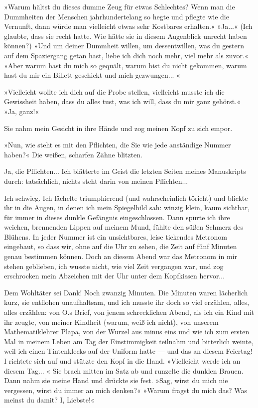 »Warum hältst du dieses dumme Zeug für etwas Schlechtes? Wenn man
die Dummheiten der Menschen jahrhundertelang so hegte und pflegte
wie die Vernunft, dann würde man vielleicht etwas sehr Kostbares
erhalten.« »Ja...« (Ich glaubte, dass sie recht hatte. Wie hätte
sie in diesem Augenblick unrecht haben können?) »Und um deiner
Dummheit willen, um dessentwillen, was du gestern auf dem
Spaziergang getan hast, liebe ich dich noch mehr, viel mehr als
zuvor.« »Aber warum hast du mich so gequält, warum bist du nicht
gekommen, warum hast du mir ein Billett geschickt und mich
gezwungen... «

»Vielleicht wollte ich dich auf die Probe stellen, vielleicht
musste ich die Gewissheit haben, dass du alles tust, was ich will,
dass du mir ganz gehörst.« »Ja, ganz!«

Sie nahm mein Gesicht in ihre Hände und zog meinen Kopf zu sich
empor.

»Nun, wie steht es mit den Pflichten, die Sie wie jede anständige
Nummer haben?« Die weißen, scharfen Zähne blitzten.

Ja, die Pflichten... Ich blätterte im Geist die letzten Seiten
meines Manuskripts durch: tatsächlich, nichts steht darin von
meinen Pflichten...

Ich schwieg. Ich lächelte triumphierend (und wahrscheinlich
töricht) und blickte ihr in die Augen, in denen ich mein
Spiegelbild sah: winzig klein, kaum sichtbar, für immer in dieses
dunkle Gefängnis eingeschlossen. Dann spürte ich ihre weichen,
brennenden Lippen auf meinem Mund, fühlte den süßen Schmerz des
Blühens. In jeder Nummer ist ein unsichtbares, leise tickendes
Metronom eingebaut, so dass wir, ohne auf die Uhr zu sehen, die
Zeit auf fünf Minuten genau bestimmen können. Doch an diesem Abend
war das Metronom in mir stehen geblieben, ich wusste nicht, wie
viel Zeit vergangen war, und zog erschrocken mein Abzeichen mit der
Uhr unter dem Kopfkissen hervor...

Dem Wohltäter sei Dank! Noch zwanzig Minuten. Die Minuten waren
lächerlich kurz, sie entflohen unaufhaltsam, und ich musste ihr
doch so viel erzählen, alles, alles erzählen: von O.s Brief, von
jenem schrecklichen Abend, als ich ein Kind mit ihr zeugte, von
meiner Kindheit (warum, weiß ich nicht), von unserem
Mathematiklehrer Plapa, von der Wurzel aus minus eins und wie ich
zum ersten Mal in meinem Leben am Tag der Einstimmigkeit teilnahm
und bitterlich weinte, weil ich einen Tintenklecks auf der Uniform
hatte — und das an diesem Feiertag! I richtete sich auf und stützte
den Kopf in die Hand. »Vielleicht werde ich an diesem Tag... « Sie
brach mitten im Satz ab und runzelte die dunklen Brauen. Dann nahm
sie meine Hand und drückte sie fest. »Sag, wirst du mich nie
vergessen, wirst du immer an mich denken?« »Warum fragst du mich
das? Was meinst du damit? I, Liebste!«

